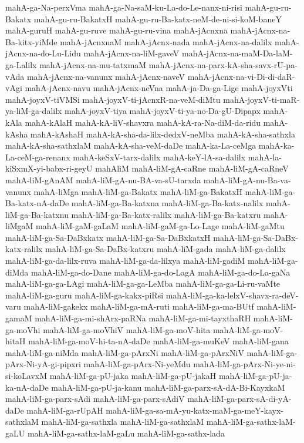 {mahA-ga-Na-perxVma
mahA-ga-Na-saM-ku-La-do-Le-nanx-ni-risi
mahA-gu-ru-Bakatx
mahA-gu-ru-BakatxH
mahA-gu-ru-Ba-katx-neM-de-ni-si-koM-baneY
mahA-guruH
mahA-gu-ruve
mahA-gu-ru-vina
mahA-jAcnxna
mahA-jAcnx-na-Ba-kitx-yiMde
mahA-jAcnxnaM
mahA-jAcnx-nada
mahA-jAcnx-na-dalilx
mahA-jAcnx-na-do-Lu-Lidu
mahA-jAcnx-na-liM-gaveV
mahA-jAcnx-na-maM-Da-laM-ga-Lalilx
mahA-jAcnx-na-mu-tatxmaM
mahA-jAcnx-na-parx-kA-sha-savx-rU-pa-vAda
mahA-jAcnx-na-vanunx
mahA-jAcnx-naveV
mahA-jAcnx-na-vi-Di-di-daR-vAgi
mahA-jAcnx-navu
mahA-jAcnx-neVna
mahA-ja-Da-ga-Lige
mahA-joyxVti
mahA-joyxV-tiVMSi
mahA-joyxV-ti-jAcnxR-na-veM-diMtu
mahA-joyxV-ti-maR-ya-liM-ga-dalilx
mahA-joyxV-tiya
mahA-joyxV-ti-ya-no-Da-gU-Dipapx
mahA-kAla
mahA-kAlaH
mahA-kA-liV-shavxra
mahA-kA-ra-Na-diM-da-ridu
mahA-kAsha
mahA-kAshaH
mahA-kA-sha-da-lilx-dedxV-neMba
mahA-kA-sha-sathxla
mahA-kA-sha-sathxlaM
mahA-kA-sha-veM-daDe
mahA-ka-La-ceMga
mahA-ka-La-ceM-ga-renanx
mahA-keSxV-tarx-dalilx
mahA-keY-lA-sa-dalilx
mahA-la-kiSxmX-yi-babx-ri-geyU
mahAliM
mahA-liM-gA-caRne
mahA-liM-gA-caRneV
mahA-liM-gAnAM
mahA-liM-gA-nu-BA-va-sU-tarxda
mahA-liM-gA-nu-Ba-va-vanunx
mahA-liMga
mahA-liM-ga-Bakatx
mahA-liM-ga-BakatxH
mahA-liM-ga-Ba-katx-nA-daDe
mahA-liM-ga-Ba-katxna
mahA-liM-ga-Ba-katx-nalilx
mahA-liM-ga-Ba-katxnu
mahA-liM-ga-Ba-katx-ralilx
mahA-liM-ga-Ba-katxru
mahA-liMgaM
mahA-liM-gaM-gaLaM
mahA-liM-gaM-ga-Lo-Lage
mahA-liM-gaMtu
mahA-liM-ga-Sa-DaBxkatx
mahA-liM-ga-Sa-DaBxkatxH
mahA-liM-ga-Sa-DaBx-katx-ralilx
mahA-liM-ga-Sa-DaBx-katxru
mahA-liM-gada
mahA-liM-ga-dalilx
mahA-liM-ga-da-lilx-ruva
mahA-liM-ga-da-lilxya
mahA-liM-gadiM
mahA-liM-ga-diMda
mahA-liM-ga-do-Dane
mahA-liM-ga-do-LagA
mahA-liM-ga-do-La-gaNa
mahA-liM-ga-ga-LAgi
mahA-liM-ga-ga-LeMba
mahA-liM-ga-ga-Li-ru-vaMte
mahA-liM-ga-guru
mahA-liM-ga-kakx-piRsi
mahA-liM-ga-ka-lelxV-shavx-ra-deV-varu
mahA-liM-gakekx
mahA-liM-ga-mA-ruti
mahA-liM-ga-ma-BUtf
mahA-liM-gamaM
mahA-liM-ga-mi-shArx-paRNa
mahA-liM-ga-mi-tayxthaRH
mahA-liM-ga-moVhi
mahA-liM-ga-moVhiV
mahA-liM-ga-moV-hita
mahA-liM-ga-moV-hitaH
mahA-liM-ga-moV-hi-ta-nA-daDe
mahA-liM-ga-muKeV
mahA-liM-gana
mahA-liM-ga-niMda
mahA-liM-ga-pArxNi
mahA-liM-ga-pArxNiV
mahA-liM-ga-pArx-Ni-yA-gi-pipxri
mahA-liM-ga-pArx-Ni-yeMdu
mahA-liM-ga-pArx-Ni-ye-ni-si-koLavxM
mahA-liM-ga-pU-jaka
mahA-liM-ga-pU-jakaH
mahA-liM-ga-pU-ja-ka-nA-daDe
mahA-liM-ga-pU-ja-kanu
mahA-liM-ga-parx-sA-dA-Bi-KayxkaM
mahA-liM-ga-parx-sAdi
mahA-liM-ga-parx-sAdiV
mahA-liM-ga-parx-sA-di-yA-daDe
mahA-liM-ga-rUpAH
mahA-liM-ga-sa-mA-yu-katx-maM-ga-meY-kayx-sathxlaM
mahA-liM-ga-sathxla
mahA-liM-ga-sathxlaM
mahA-liM-ga-sathx-laM-gaLU
mahA-liM-ga-sathx-laM-gaLu
mahA-liM-ga-sathx-lada
}
